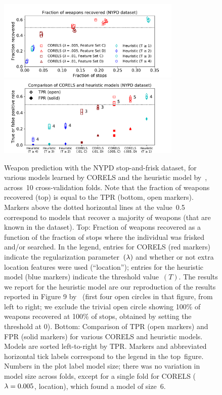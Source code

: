 \begin{figure}[t!]
\begin{center}
\includegraphics[trim={12mm, 0mm, 24mm, 5mm},
width=0.78\textwidth]{figs/cpw_folds.pdf}
\includegraphics[trim={12mm, 5mm, 24mm, 0mm},
width=0.78\textwidth]{figs/cpw_tpr_fpr.pdf}
\end{center}
\caption{Weapon prediction with the NYPD stop-and-frisk dataset,
for various models learned by CORELS and the heuristic model by~\citet{Goel16},
across~10 cross-validation folds.
%
Note that the fraction of weapons recovered (top) is equal to the TPR (bottom, open markers).
%
Markers above the dotted horizontal lines at the value~0.5 correspond to models that
recover a majority of weapons (that are known in the dataset).
%
Top: Fraction of weapons recovered as a function of the fraction of stops
where the individual was frisked and/or searched.
%
In the legend, entries for CORELS (red markers) indicate the regularization parameter~$({\lambda})$
and whether or not extra location features were used (``location'');
entries for the heuristic model (blue markers) indicate the threshold value~$(T)$.
%
The results we report for the heuristic model
are our reproduction of the results reported in Figure 9 by~\citet{Goel16}
(first four open circles in that figure, from left to right; we exclude the trivial open circle
showing 100\% of weapons recovered at 100\% of stops, obtained by setting the threshold at 0).
%
Bottom: Comparison of TPR (open markers) and FPR (solid markers) for various
CORELS and heuristic models.
%
Models are sorted left-to-right by TPR.
%
Markers and abbreviated horizontal tick labels correspond to the legend in the top~figure.
%
Numbers in the plot label model size; there was no variation in model size across folds,
except for a single fold for CORELS (${{\lambda} = 0.005}$, location), which found a model of size~6.
}
\label{fig:frisk}
\end{figure}

